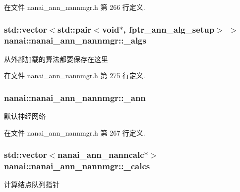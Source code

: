在文件 nanai\+\_\+ann\+\_\+nannmgr.\+h 第 266 行定义.

\hypertarget{classnanai_1_1nanai__ann__nannmgr_a3402ccfa83590793eb0755110e4a023e}{}
\subsubsection[{\+\_\+algs}]{\setlength{\rightskip}{0pt plus 5cm}std\+::vector$<$std\+::pair$<$void$\ast$, {\bf fptr\+\_\+ann\+\_\+alg\+\_\+setup}$>$ $>$ nanai\+::nanai\+\_\+ann\+\_\+nannmgr\+::\+\_\+algs\hspace{0.3cm}{\ttfamily [protected]}}\label{classnanai_1_1nanai__ann__nannmgr_a3402ccfa83590793eb0755110e4a023e}
从外部加载的算法都要保存在这里 

在文件 nanai\+\_\+ann\+\_\+nannmgr.\+h 第 275 行定义.

\hypertarget{classnanai_1_1nanai__ann__nannmgr_aa808696e65d0f030afe6e2de2b7d3e6d}{}
\subsubsection[{\+\_\+ann}]{ nanai\+::nanai\+\_\+ann\+\_\+nannmgr\+::\+\_\+ann\hspace{0.3cm}{\ttfamily [protected]}}\label{classnanai_1_1nanai__ann__nannmgr_aa808696e65d0f030afe6e2de2b7d3e6d}
默认神经网络 

在文件 nanai\+\_\+ann\+\_\+nannmgr.\+h 第 267 行定义.

\hypertarget{classnanai_1_1nanai__ann__nannmgr_a25dc5374ad7545e1c6255afb647264a9}{}
\subsubsection[{\+\_\+calcs}]{\setlength{\rightskip}{0pt plus 5cm}std\+::vector$<${\bf nanai\+\_\+ann\+\_\+nanncalc}$\ast$$>$ nanai\+::nanai\+\_\+ann\+\_\+nannmgr\+::\+\_\+calcs\hspace{0.3cm}{\ttfamily [protected]}}\label{classnanai_1_1nanai__ann__nannmgr_a25dc5374ad7545e1c6255afb647264a9}
计算结点队列指针 

